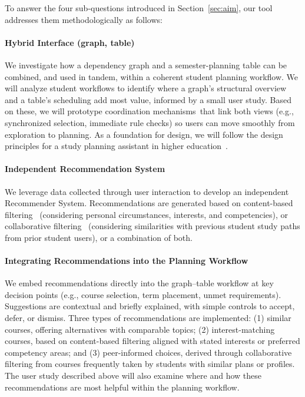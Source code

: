 \documentclass[paper=a4,fontsize=11pt,oneside,titlepage]{scrartcl}
\begin{document}
To answer the four sub-questions introduced in Section~\ref{sec:aim}, our tool addresses them methodologically as follows:

\paragraph{Hybrid Interface (graph, table)}
We investigate how a dependency graph and a semester-planning table can be combined, and used in tandem, within a coherent student planning workflow. We will analyze student workflows to identify where a graph’s structural overview and a table’s scheduling add most value, informed by a small user study. Based on these, we will prototype coordination mechanisms\ that link both views (e.g., synchronized selection, immediate rule checks) so users can move smoothly from exploration to planning. As a foundation for design, we will follow the design principles for a study planning assistant in higher education~\cite{bartel_design_2024}.

\paragraph{Independent Recommendation System}  
We leverage data collected through user interaction to develop an independent Recommender System. Recommendations are generated based on content-based filtering~\cite{esteban_helping_2020, vuong_personalized_2019} (considering personal circumstances, interests, and competencies), or collaborative filtering~\cite{bhumichitr_recommender_2017, esteban_helping_2020, al-badarenah_automated_2016} (considering similarities with previous student study paths from prior student users), or a combination of both.


\paragraph{Integrating Recommendations into the Planning Workflow}
We embed recommendations directly into the graph–table workflow at key decision points (e.g., course selection, term placement, unmet requirements). Suggestions are contextual and briefly explained, with simple controls to accept, defer, or dismiss. Three types of recommendations are implemented: (1) similar courses, offering alternatives with comparable topics; (2) interest-matching courses, based on content-based filtering aligned with stated interests or preferred competency areas; and (3) peer-informed choices, derived through collaborative filtering from courses frequently taken by students with similar plans or profiles. The user study described above will also examine where and how these recommendations are most helpful within the planning workflow.
\end{document}
